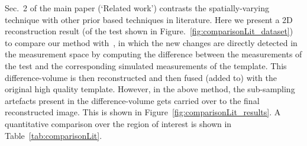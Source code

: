 \documentclass{article}
\begin{document}
Sec.~2 of the main paper (`Related work') contrasts the spatially-varying technique  with other prior based techniques in literature. Here we present a 2D reconstruction  result (of the test shown in Figure.~\ref{fig:comparisonLit_dataset}) to compare our method with~\cite{Lee2012}, in which the new changes are directly detected in the measurement space by computing the difference between the measurements of the test and the corresponding simulated measurements of the template. This difference-volume is then reconstructed and then fused (added to) with the original high quality template. However, in the above method, the sub-sampling artefacts present in the difference-volume gets carried over to the final reconstructed image. This is shown in Figure~\ref{fig:comparisonLit_results}. A quantitative comparison over the region of interest is shown in Table~\ref{tab:comparisonLit}.
\end{document}
